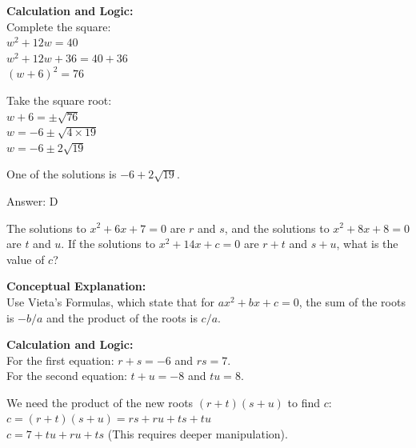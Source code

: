 \documentclass[11pt,paper=a4,answers]{exam}
\begin{document}
\begin{questions}
\begin{solution}
\vspace{20pt}

\textbf{Calculation and Logic:} \\
Complete the square: \\
$w^2 + 12w = 40$ \\
$w^2 + 12w + 36 = 40 + 36$ \\
$(w + 6)^2 = 76$

\vspace{10pt}

Take the square root: \\
$w + 6 = \pm \sqrt{76}$ \\
$w = -6 \pm \sqrt{4 \times 19}$ \\
$w = -6 \pm 2\sqrt{19}$

\vspace{10pt}

One of the solutions is $-6 + 2\sqrt{19}$.

\vspace{25pt}

Answer: \colorbox{yellow!100}{D}
\end{solution}

\vspace{40pt}

\question
The solutions to $x^2 + 6x + 7 = 0$ are $r$ and $s$, and the solutions to $x^2 + 8x + 8 = 0$ are $t$ and $u$. If the solutions to $x^2 + 14x + c = 0$ are $r + t$ and $s + u$, what is the value of $c$?

\begin{solution}
\textbf{Conceptual Explanation:} \\
Use Vieta's Formulas, which state that for $ax^2 + bx + c = 0$, the sum of the roots is $-b/a$ and the product of the roots is $c/a$. 

\vspace{20pt}

\textbf{Calculation and Logic:} \\
For the first equation: $r + s = -6$ and $rs = 7$. \\
For the second equation: $t + u = -8$ and $tu = 8$.

\vspace{10pt}

We need the product of the new roots $(r + t)(s + u)$ to find $c$: \\
$c = (r + t)(s + u) = rs + ru + ts + tu$ \\
$c = 7 + tu + ru + ts$ (This requires deeper manipulation).


\end{solution}
\end{questions}
\end{document}
